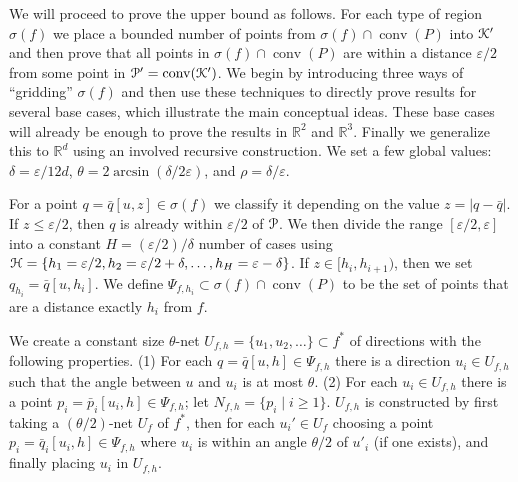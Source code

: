 \documentclass[11pt]{myclass}
\newcommand{\eps}{\varepsilon}
\renewcommand{\c}[1]{\ensuremath{\EuScript{#1}}}
\renewcommand{\b}[1]{\ensuremath{\mathbb{#1}}}
\def\kernel{\EuScript{K}}
\newcommand{\conv}[1]{\mathop{\mathrm{conv}}(#1)}
\newcommand{\dual}[1]{{#1}^*}
\newcommand{\polyt}{\EuScript{P}}
\newcommand{\fp}{\bar{p}}
\newcommand{\fq}{\bar{q}}
\newcommand{\point}[3]{{#1}[#3,#2]}
\begin{document}
We will proceed to prove the upper bound as follows.  For each type of region $\sigma(f)$ we place a bounded number of points from $\sigma(f) \cap \conv{P}$ into $\kernel'$ and then prove that all points in $\sigma(f) \cap \conv{P}$ are within a distance $\eps/2$ from some point in $\polyt' = \conv{\kernel'}$.  
We begin by introducing three ways of ``gridding'' $\sigma(f)$ and then use these techniques to directly prove results for several base cases, which illustrate the main conceptual ideas.  These base cases will already be enough to prove the results in $\b{R}^2$ and $\b{R}^3$.  Finally we generalize this to $\b{R}^d$ using an involved recursive construction.  
We set a few global values: $\delta = \eps/12d$, $\theta = 2\arcsin (\delta/2\eps)$, and $\rho = \delta/\eps$.  


\begin{description} \denselist
\item[1: Creating layers.]
For a point $q = \point{\fq}{z}{u} \in \sigma(f)$ we classify it depending on the value $z = |q-\fq|$.  If $z \leq \eps/2$, then $q$ is already within $\eps/2$ of $\polyt$.  We then divide the range $[\eps/2, \eps]$ into a constant $H = (\eps/2)/\delta$ number of cases using $\c{H} = \{ h_1 = \eps/2, h_2 = \eps/2+\delta, \ldots, h_H = \eps-\delta \}$.  If $z \in [h_i, h_{i+1})$, then we set $q_{h_i} = \point{\fq}{h_i}{u}$.  We define $\Psi_{f,h_i} \subset \sigma(f) \cap \conv{P}$ to be the set of points that are a distance exactly $h_i$ from $f$.  
\vspace{1mm}

\item[2: Discretize angles.]
We create a constant size $\theta$-net $U_{f,h} = \{u_1, u_2, \ldots\} \subset \dual{f}$ of directions with the following properties.
(1) For each $q = \point{\fq}{h}{u} \in \Psi_{f,h}$ there is a direction $u_i \in U_{f,h}$ such that the angle between $u$ and $u_i$ is at most $\theta$.
(2) For each $u_i \in U_{f,h}$ there is a point $p_i = \point{\fp_i}{h}{u_i} \in \Psi_{f,h}$; let $N_{f,h} = \{p_i \mid i \geq  1\}$.  
$U_{f,h}$ is constructed by first taking a $(\theta/2)$-net $U_f$ of $\dual{f}$, then for each $u_i' \in U_f$ choosing a point $p_i = \point{\fq_i}{h}{u_i} \in \Psi_{f,h}$ where $u_i$ is within an angle $\theta/2$ of $u'_i$ (if one exists), and finally placing $u_i$ in $U_{f,h}$.  
\vspace{1mm}


\end{description}
\end{document}
